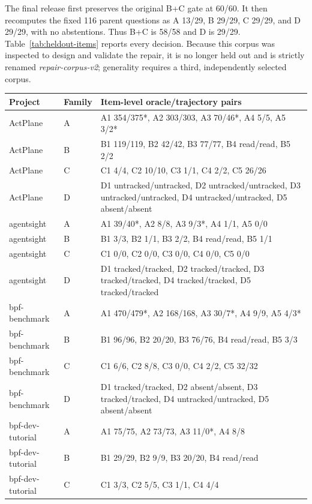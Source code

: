 \documentclass[letterpaper]{article}
\begin{document}
The final release first preserves the original B+C gate at 60/60.  It then
recomputes the fixed 116 parent questions as A 13/29, B 29/29, C 29/29, and D
29/29, with no abstentions.  Thus B+C is 58/58 and D is 29/29.
Table~\ref{tab:heldout-items} reports every decision.  Because this corpus was
inspected to design and validate the repair, it is no longer held out and is
strictly renamed \emph{repair-corpus-v2}; generality requires a third,
independently selected corpus.

\begin{table}[t]
  \centering
  \scriptsize
  \setlength{\tabcolsep}{3pt}
  \begin{tabularx}{\textwidth}{@{}llX@{}}
    \toprule
    Project & Family & Item-level oracle/trajectory pairs \\
    \midrule
    ActPlane & A & A1 354/375*, A2 303/303, A3 70/46*, A4 5/5, A5 3/2* \\
    ActPlane & B & B1 119/119, B2 42/42, B3 77/77, B4 read/read, B5 2/2 \\
    ActPlane & C & C1 4/4, C2 10/10, C3 1/1, C4 2/2, C5 26/26 \\
    ActPlane & D & D1 untracked/untracked, D2 untracked/untracked, D3 untracked/untracked, D4 untracked/untracked, D5 absent/absent \\
    agentsight & A & A1 39/40*, A2 8/8, A3 9/3*, A4 1/1, A5 0/0 \\
    agentsight & B & B1 3/3, B2 1/1, B3 2/2, B4 read/read, B5 1/1 \\
    agentsight & C & C1 0/0, C2 0/0, C3 0/0, C4 0/0, C5 0/0 \\
    agentsight & D & D1 tracked/tracked, D2 tracked/tracked, D3 tracked/tracked, D4 tracked/tracked, D5 tracked/tracked \\
    bpf-benchmark & A & A1 470/479*, A2 168/168, A3 30/7*, A4 9/9, A5 4/3* \\
    bpf-benchmark & B & B1 96/96, B2 20/20, B3 76/76, B4 read/read, B5 3/3 \\
    bpf-benchmark & C & C1 6/6, C2 8/8, C3 0/0, C4 2/2, C5 32/32 \\
    bpf-benchmark & D & D1 tracked/tracked, D2 absent/absent, D3 tracked/tracked, D4 untracked/untracked, D5 absent/absent \\
    bpf-dev-tutorial & A & A1 75/75, A2 73/73, A3 11/0*, A4 8/8 \\
    bpf-dev-tutorial & B & B1 29/29, B2 9/9, B3 20/20, B4 read/read \\
    bpf-dev-tutorial & C & C1 3/3, C2 5/5, C3 1/1, C4 4/4 \\

\end{tabularx}
\end{table}
\end{document}
